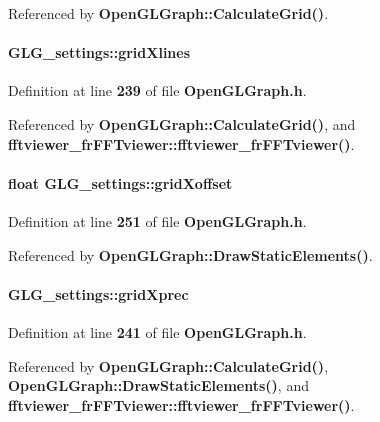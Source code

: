 Referenced by {\bf Open\+G\+L\+Graph\+::\+Calculate\+Grid()}.

\paragraph[{grid\+Xlines}]{ G\+L\+G\+\_\+settings\+::grid\+Xlines}\label{structGLG__settings_aab02f1df4493113be50699f291e259f5}


Definition at line {\bf 239} of file {\bf Open\+G\+L\+Graph.\+h}.



Referenced by {\bf Open\+G\+L\+Graph\+::\+Calculate\+Grid()}, and {\bf fftviewer\+\_\+fr\+F\+F\+Tviewer\+::fftviewer\+\_\+fr\+F\+F\+Tviewer()}.

\paragraph[{grid\+Xoffset}]{\setlength{\rightskip}{0pt plus 5cm}float G\+L\+G\+\_\+settings\+::grid\+Xoffset}\label{structGLG__settings_ac47e1d9eb5e7b4fd60352023546b1502}


Definition at line {\bf 251} of file {\bf Open\+G\+L\+Graph.\+h}.



Referenced by {\bf Open\+G\+L\+Graph\+::\+Draw\+Static\+Elements()}.

\paragraph[{grid\+Xprec}]{ G\+L\+G\+\_\+settings\+::grid\+Xprec}\label{structGLG__settings_a763c1b96ea50464928b2d4080537077f}


Definition at line {\bf 241} of file {\bf Open\+G\+L\+Graph.\+h}.



Referenced by {\bf Open\+G\+L\+Graph\+::\+Calculate\+Grid()}, {\bf Open\+G\+L\+Graph\+::\+Draw\+Static\+Elements()}, and {\bf fftviewer\+\_\+fr\+F\+F\+Tviewer\+::fftviewer\+\_\+fr\+F\+F\+Tviewer()}.

